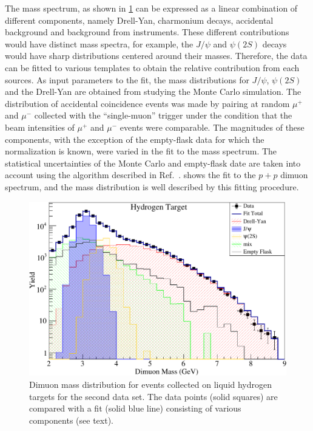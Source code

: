\documentclass[reprint,aps,unsortedaddress,superscriptaddress,prl,floatfix,showpacs,linenumbers,final]{revtex4-2}
\begin{document}
The mass spectrum, as shown in \cref{fig:massfit} can be expressed as a linear combination of different components,
namely Drell-Yan, charmonium decays, accidental background and background from instruments.
These different contributions would have distinct mass spectra, for example, the $J/\psi$
and $\psi\left(2S\right)$ decays would have sharp distributions centered around their masses.
Therefore, the data can be fitted to various templates to obtain
the relative contribution from each sources.
As input parameters to the fit, the mass distributions for $J/\psi$, $\psi\left(2S\right)$
and the Drell-Yan are obtained from studying the Monte Carlo simulation. %
The distribution of accidental coincidence events was made by pairing at random $\mu^+$ and $\mu^-$ collected with the ``single-muon'' trigger
under the condition that the beam intensities of $\mu^+$ and $\mu^-$ events were comparable.
The magnitudes of these components,
with the exception of the empty-flask data for which the normalization is known,
were varied in the fit to the mass spectrum.
The statistical uncertainties of the Monte Carlo and empty-flask date are taken into account using the algorithm described in Ref.~\cite{barlow1993}.
 shows the fit to the $p+p$ dimuon spectrum,
and the mass distribution is well described by this fitting procedure.
\begin{figure}[htbp!]
	\centering
	\includegraphics[width=\linewidth]{massfit_run56_LH2.pdf}
	\caption{Dimuon mass distribution for events collected
		on liquid hydrogen targets for the second data set.
		The data points (solid squares) are compared with a fit (solid blue line) consisting of
		various components (see text).}
	\label{fig:massfit}
\end{figure}
\end{document}
